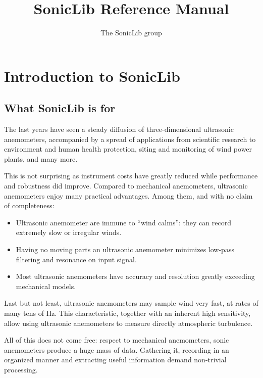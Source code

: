 \documentclass[a4paper,10pt]{book}
\begin{document}
\author{The SonicLib group}
\title{SonicLib Reference Manual}
\maketitle

\newpage
\tableofcontents
\newpage

\chapter{Introduction to SonicLib}
\label{chap:SonicLib}

\section{What SonicLib is for}
\label{sec:SonicLib purpose}

The last years have seen a steady diffusion of three-dimensional ultrasonic anemometers, accompanied by a spread of applications from scientific research to environment and human health protection, siting and monitoring of wind power plants, and many more.

This is not surprising as instrument costs have greatly reduced while performance and robustness did improve. Compared to mechanical anemometers, ultrasonic anemometers enjoy many practical advantages. Among them, and with no claim of completeness:

\begin{itemize}
 \item Ultrasonic anemometer are immune to ``wind calms'': they can record extremely slow or irregular winds.
 \item Having no moving parts an ultrasonic anemometer minimizes low-pass filtering and resonance on input signal.
 \item Most ultrasonic anemometers have accuracy and resolution greatly exceeding mechanical models.
\end{itemize}

Last but not least, ultrasonic anemometers may sample wind very fast, at rates of many tens of Hz. This characteristic, together with an inherent high sensitivity, allow using ultrasonic anemometers to measure directly atmospheric turbulence.

All of this does not come free: respect to mechanical anemometers, sonic anemometers produce a huge mass of data. Gathering it, recording in an organized manner and extracting useful information demand non-trivial processing.
\end{document}
